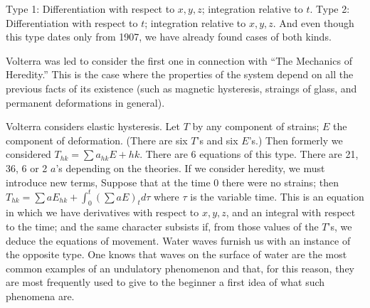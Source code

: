 \documentclass[12pt,oneside]{book}
\begin{document}
Type 1: Differentiation with respect to $x,y,z$; integration relative to $t$. Type 2: Differentiation with respect to $t$; integration relative to $x,y,z$. And even though this type dates only from 1907, we have already found cases of both kinds. \par 

Volterra was led to consider the first one in connection with ``The Mechanics of Heredity.'' This is the case where the properties of the system depend on all the previous facts of its existence (such as magnetic hysteresis, straings of glass, and permanent deformations in general). \par 

Volterra considers elastic hysteresis. Let $T$ by any component of strains; $E$ the component of deformation. (There are six $T$'s and six $E$'s.) Then formerly we considered $T_{hk}=\sum a_{hk}E+{hk}$. There are 6 equations of this type. There are 21, 36, 6 or 2 $a$'s depending on the theories. If we consider heredity, we must introduce new terms, Suppose that at the time 0 there were no strains; then $T_{hk}=\sum aE_{hk}+\int_0^t(\sum aE)_td\tau$ where $\tau$ is the variable time. This is an equation in which we have derivatives with respect to $x,y,z$, and an integral with respect to the time; and the same character subsists if, from those values of the $T$'s, we deduce the equations of movement. Water waves furnish us with an instance of the opposite type. One knows that waves on the surface of water are the most common examples of an undulatory phenomenon and that, for this reason, they are most frequently used to give to the beginner a first idea of what such phenomena are. \par 
\end{document}
